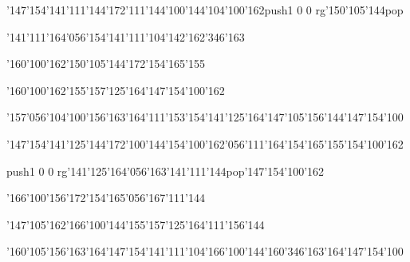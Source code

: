 \null\vfill\ipa\centerline{\enskip\char'147\char'154\char'141\char'111\char'144\char'172\enskip\char'111\char'144\enskip\enskip\enskip\enskip\char'100\char'144\enskip\enskip\enskip\char'104\char'100\char'162\enskip\pdfcolorstack\match push{1 0 0 rg}\char'150\char'105\char'144\pdfcolorstack\match pop{}}\medskip\centerline{\enskip\char'141\char'111\char'164\char'056\char'154\char'141\char'111\char'104\enskip\enskip\enskip\enskip\enskip\enskip\enskip\enskip\enskip\enskip\enskip\char'142\char'162\char'346\char'163}\medskip\centerline{\enskip\char'160\char'100\char'162\enskip\enskip\enskip\enskip\char'150\char'105\char'144\char'172\enskip\enskip\enskip\char'154\char'165\char'155}\medskip\centerline{\enskip\enskip\enskip\enskip\char'160\char'100\char'162\enskip\enskip\enskip\enskip\enskip\char'155\char'157\char'125\char'164\enskip\enskip\enskip\enskip\enskip\char'147\char'154\char'100\char'162}\medskip\centerline{\enskip\char'157\char'056\char'104\char'100\char'156\char'163\char'164\enskip\char'111\enskip\char'153\char'154\char'141\char'125\char'164\enskip\enskip\enskip\enskip\enskip\enskip\char'147\char'105\char'156\char'144\enskip\char'147\char'154\char'100}\medskip\vfill\footline{\hfil\tt\folio\hfil}\eject
\null\vfill\ipa\centerline{\enskip\char'147\char'154\char'141\char'125\char'144\char'172\enskip\char'100\char'144\enskip\char'154\char'100\char'162\char'056\char'111\char'164\enskip\enskip\enskip\char'154\char'165\char'155\enskip\char'154\char'100\char'162}\medskip\centerline{\enskip\pdfcolorstack\match push{1 0 0 rg}\char'141\char'125\char'164\char'056\char'163\char'141\char'111\char'144\pdfcolorstack\match pop{}\enskip\enskip\enskip\enskip\enskip\enskip\enskip\enskip\enskip\enskip\enskip\char'147\char'154\char'100\char'162}\medskip\centerline{\enskip\enskip\enskip\enskip\enskip\enskip\enskip\enskip\char'166\char'100\char'156\char'172\enskip\char'154\char'165\char'056\char'167\char'111\char'144}\medskip\centerline{\enskip\enskip\enskip\enskip\char'147\char'105\char'162\enskip\char'166\char'100\char'144\enskip\char'155\char'157\char'125\char'164\enskip\char'111\char'156\char'144\enskip\enskip\enskip\enskip\enskip}\medskip\centerline{\enskip\enskip\char'160\char'105\char'156\char'163\char'164\enskip\enskip\enskip\char'147\char'154\char'141\char'111\char'104\enskip\char'166\char'100\char'144\enskip\enskip\enskip\char'160\char'346\char'163\char'164\enskip\char'147\char'154\char'100}\medskip\vfill\footline{\hfil\tt\folio\hfil}\eject
